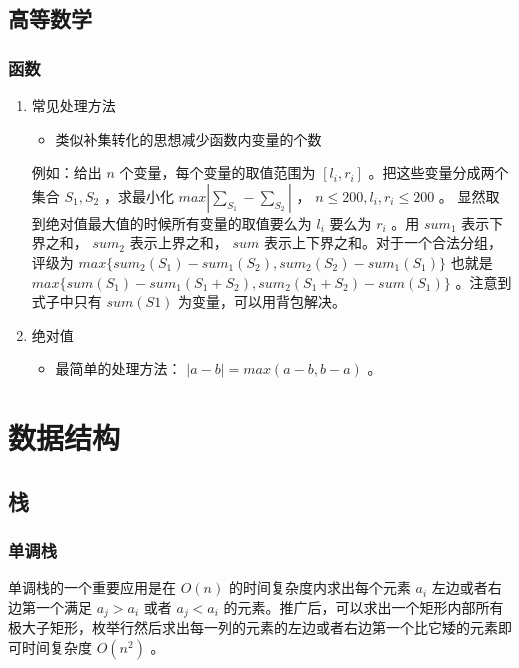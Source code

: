 \documentclass[11pt]{article}
\begin{document}
\subsection{高等数学}
\label{sec-3-5}
\subsubsection{函数}
\label{sec-3-5-1}

\begin{enumerate}
\item 常见处理方法
\label{sec-3-5-1-1}

\begin{itemize}
\item 类似补集转化的思想减少函数内变量的个数
\end{itemize}

例如：给出 $n$ 个变量，每个变量的取值范围为 $[l_i,r_i]$ 。把这些变量分成两个集合 $S_1,S_2$ ，求最小化 $max|\sum_{S_1}-\sum_{S_2}|$ ， $n \leq 200, l_i, r_i \leq 200$ 。 显然取到绝对值最大值的时候所有变量的取值要么为 $l_i$ 要么为 $r_i$ 。用 $sum_1$ 表示下界之和， $sum_2$ 表示上界之和， $sum$ 表示上下界之和。对于一个合法分组，评级为 $max\{sum_2(S_1)-sum_1(S_2),sum_2(S_2)-sum_1(S_1)\}$ 也就是 $max\{sum(S_1)-sum_1(S_1+S_2),sum_2(S_1+S_2)-sum(S_1)\}$ 。注意到式子中只有 $sum(S1)$ 为变量，可以用背包解决。

\item 绝对值
\label{sec-3-5-1-2}

\begin{itemize}
\item 最简单的处理方法： $|a-b| = max(a - b, b - a)$ 。
\end{itemize}
\end{enumerate}
\section{数据结构}
\label{sec-4}
\subsection{栈}
\label{sec-4-1}
\subsubsection{单调栈}
\label{sec-4-1-1}

单调栈的一个重要应用是在 $O(n)$ 的时间复杂度内求出每个元素 $a_i$ 左边或者右边第一个满足 $a_j > a_i$ 或者 $a_j < a_i$ 的元素。推广后，可以求出一个矩形内部所有极大子矩形，枚举行然后求出每一列的元素的左边或者右边第一个比它矮的元素即可时间复杂度 $O(n^2)$ 。
\end{document}

